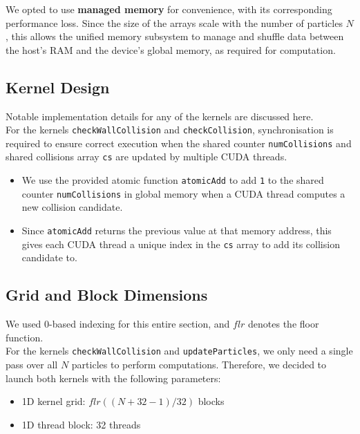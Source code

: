 \documentclass[12pt]{article}
\begin{document}
We opted to use \textbf{managed memory} for convenience, with its corresponding performance loss. Since the size of the arrays scale with the number of particles $N$, this allows the unified memory subsystem to manage and shuffle data between the host's RAM and the device's global memory, as required for computation.

\subsection{Kernel Design}

Notable implementation details for any of the kernels are discussed here.\\

For the kernels \texttt{checkWallCollision} and \texttt{checkCollision}, synchronisation is required to ensure correct execution when the shared counter \texttt{numCollisions} and shared collisions array \texttt{cs} are updated by multiple CUDA threads.
\begin{itemize}
    \item We use the provided atomic function \texttt{atomicAdd} to add \texttt{1} to the shared counter \texttt{numCollisions} in global memory when a CUDA thread computes a new collision candidate.
    \item Since \texttt{atomicAdd} returns the previous value at that memory address, this gives each CUDA thread a unique index in the \texttt{cs} array to add its collision candidate to.
\end{itemize}

\pagebreak

\subsection{Grid and Block Dimensions}

We used 0-based indexing for this entire section, and $flr$ denotes the floor function.\\

For the kernels \texttt{checkWallCollision} and \texttt{updateParticles}, we only need a single pass over all $N$ particles to perform computations. Therefore, we decided to launch both kernels with the following parameters:
\begin{itemize}
    \item 1D kernel grid: $flr((N + 32 - 1) / 32)$  blocks
    \item 1D thread block: 32 threads
\end{itemize}
\end{document}
